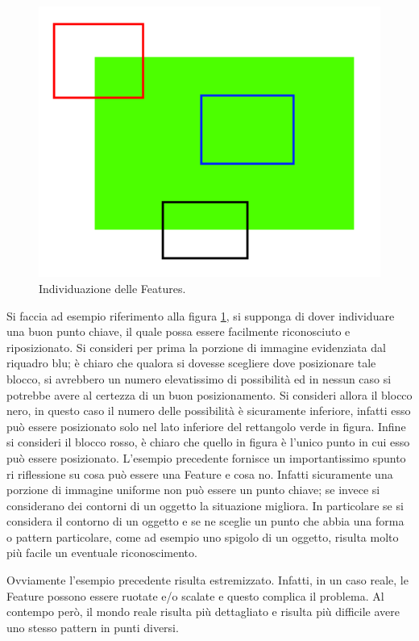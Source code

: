 \begin{figure}[h]
	\centering
	\includegraphics[width=420pt]{imgs/feature_simple.png}
	\caption{Individuazione delle Features.}
	\label{vis:feature:detect}
\end{figure} 

Si faccia ad esempio riferimento alla figura \ref{vis:feature:detect}, si supponga di dover individuare una buon punto chiave, il quale possa essere facilmente riconosciuto e riposizionato. Si consideri per prima la porzione di immagine evidenziata dal riquadro blu; è chiaro che qualora si dovesse scegliere dove posizionare tale blocco, si avrebbero un numero elevatissimo di possibilità ed in nessun caso si potrebbe avere al certezza di un buon posizionamento. Si consideri allora il blocco nero, in questo caso il numero delle possibilità è sicuramente inferiore, infatti esso può essere posizionato solo nel lato inferiore del rettangolo verde in figura. Infine si consideri il blocco rosso, è chiaro che quello in figura è l'unico punto in cui esso può essere posizionato.
L'esempio precedente fornisce un importantissimo spunto ri riflessione su cosa può essere una Feature e cosa no. Infatti sicuramente una porzione di immagine uniforme non può essere un punto chiave; se invece si considerano dei contorni di un oggetto la situazione migliora. In particolare se si considera il contorno di un oggetto e se ne sceglie un punto che abbia una forma o pattern particolare, come ad esempio uno spigolo di un oggetto, risulta molto più facile un eventuale riconoscimento. 

Ovviamente l'esempio precedente risulta estremizzato. Infatti, in un caso reale, le Feature possono essere ruotate e/o scalate e questo complica il problema. Al contempo però, il mondo reale risulta più dettagliato e risulta più difficile avere uno stesso pattern in punti diversi.

